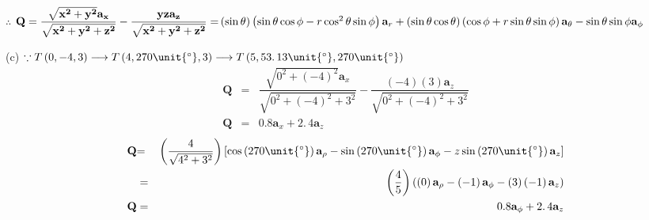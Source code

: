 \documentclass{article}
\begin{document}
$\therefore $ $\mathbf{Q=\dfrac{\sqrt{x^{2}+y^{2}}\mathbf{a}_{x}}{\sqrt{%
x^{2}+y^{2}+z^{2}}}-\dfrac{yz\mathbf{a}_{z}}{\sqrt{x^{2}+y^{2}+z^{2}}}=}%
\left( \sin \theta \right) \left( \sin \theta \cos \phi -r\cos ^{2}\theta
\sin \phi \right) \mathbf{a}_{r}+\left( \sin \theta \cos \theta \right)
\left( \cos \phi +r\sin \theta \sin \phi \right) \mathbf{a}_{\theta }-\sin
\theta \sin \phi \mathbf{a}_{\phi }$

(c) $\because T\left( 0,-4,3\right) \longrightarrow T\left( 4,270\unit{%
{{}^\circ}%
},3\right) \longrightarrow T\left( 5,53.\,\allowbreak 13\unit{%
{{}^\circ}%
},270\unit{%
{{}^\circ}%
}\right) $%
\begin{eqnarray*}
\mathbf{Q} &\mathbf{=}&\dfrac{\sqrt{0^{2}+\left( -4\right) ^{2}}\mathbf{a}%
_{x}}{\sqrt{0^{2}+\left( -4\right) ^{2}+3^{2}}}-\dfrac{\left( -4\right)
\left( 3\right) \mathbf{a}_{z}}{\sqrt{0^{2}+\left( -4\right) ^{2}+3^{2}}} \\
\mathbf{Q} &=&0.8\mathbf{a}_{x}+2.\,\allowbreak 4\mathbf{a}_{z}
\end{eqnarray*}
\begin{eqnarray*}
\mathbf{Q} &\mathbf{=}&\left( \dfrac{4}{\sqrt{4^{2}+3^{2}}}\right) \left[
\cos \left( 270\unit{%
{{}^\circ}%
}\right) \mathbf{a}_{\rho }-\sin \left( 270\unit{%
{{}^\circ}%
}\right) \mathbf{a}_{\phi }-z\sin \left( 270\unit{%
{{}^\circ}%
}\right) \mathbf{a}_{z}\right] \\
&=&\left( \dfrac{4}{5}\right) \left( \left( 0\right) \mathbf{a}_{\rho
}-\left( -1\right) \mathbf{a}_{\phi }-\left( 3\right) \left( -1\right) 
\mathbf{a}_{z}\right) \\
\mathbf{Q} &=&0.8\mathbf{a}_{\phi }+2.\,\allowbreak 4\mathbf{a}_{z}
\end{eqnarray*}%
\end{document}
